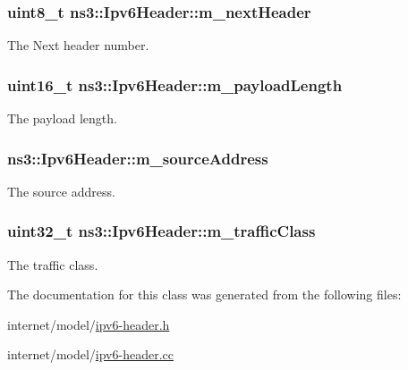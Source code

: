 \subsubsection[{\texorpdfstring{m\+\_\+next\+Header}{m_nextHeader}}]{\setlength{\rightskip}{0pt plus 5cm}uint8\+\_\+t ns3\+::\+Ipv6\+Header\+::m\+\_\+next\+Header\hspace{0.3cm}{\ttfamily [private]}}\hypertarget{classns3_1_1Ipv6Header_a9fcad57248a77bd54e75d381b551907a}{}\label{classns3_1_1Ipv6Header_a9fcad57248a77bd54e75d381b551907a}


The Next header number. 

\subsubsection[{\texorpdfstring{m\+\_\+payload\+Length}{m_payloadLength}}]{\setlength{\rightskip}{0pt plus 5cm}uint16\+\_\+t ns3\+::\+Ipv6\+Header\+::m\+\_\+payload\+Length\hspace{0.3cm}{\ttfamily [private]}}\hypertarget{classns3_1_1Ipv6Header_a8f7c17fc4a76bb3fd7b314f89dd16da0}{}\label{classns3_1_1Ipv6Header_a8f7c17fc4a76bb3fd7b314f89dd16da0}


The payload length. 

\subsubsection[{\texorpdfstring{m\+\_\+source\+Address}{m_sourceAddress}}]{ ns3\+::\+Ipv6\+Header\+::m\+\_\+source\+Address\hspace{0.3cm}{\ttfamily [private]}}\hypertarget{classns3_1_1Ipv6Header_a89d6831bbc4f59d25e0f5f569b95573e}{}\label{classns3_1_1Ipv6Header_a89d6831bbc4f59d25e0f5f569b95573e}


The source address. 

\subsubsection[{\texorpdfstring{m\+\_\+traffic\+Class}{m_trafficClass}}]{\setlength{\rightskip}{0pt plus 5cm}uint32\+\_\+t ns3\+::\+Ipv6\+Header\+::m\+\_\+traffic\+Class\hspace{0.3cm}{\ttfamily [private]}}\hypertarget{classns3_1_1Ipv6Header_aec156ee7eaef08d6fdb38f028a32747e}{}\label{classns3_1_1Ipv6Header_aec156ee7eaef08d6fdb38f028a32747e}


The traffic class. 



The documentation for this class was generated from the following files\+:\begin{DoxyCompactItemize}
\item 
internet/model/\hyperlink{ipv6-header_8h}{ipv6-\/header.\+h}\item 
internet/model/\hyperlink{ipv6-header_8cc}{ipv6-\/header.\+cc}\end{DoxyCompactItemize}
